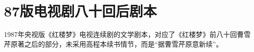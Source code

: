 \chapter{87版电视剧八十回后剧本}

1987年央视版《红楼梦》电视连续剧的文学剧本，对应了《红楼梦》前八十回曹雪芹原著之后的部分，未采用高程本续书情节，而是“据曹雪芹原意新续”。







